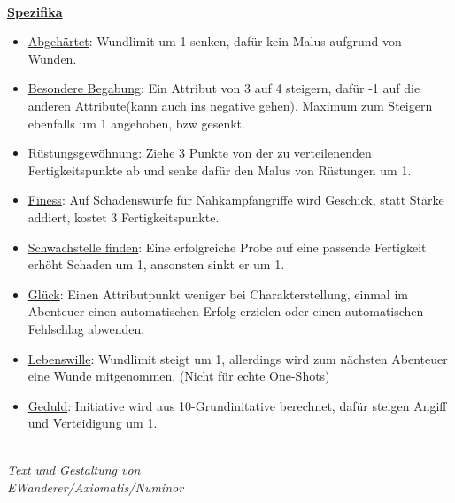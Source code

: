 \documentclass[twoside,a4paper]{minimal}
\begin{document}
\begin{multicols*}{3}
\textbf{\uline{\\Spezifika}}
\begin{itemize}
\item \uline{Abgehärtet}: Wundlimit um 1 senken, dafür kein Malus aufgrund von Wunden.
\item \uline{Besondere Begabung}: Ein Attribut von 3 auf 4 steigern, dafür -1 auf die anderen Attribute(kann auch ins negative gehen). Maximum zum Steigern ebenfalls um 1 angehoben, bzw gesenkt.
\item \uline{Rüstungsgewöhnung}: Ziehe 3 Punkte von der zu verteilenenden Fertigkeitspunkte ab und senke dafür den Malus von Rüstungen um 1.
\item \uline{Finess}: Auf Schadenswürfe für Nahkampfangriffe wird Geschick, statt Stärke addiert, kostet 3 Fertigkeitspunkte.
\item \uline{Schwachstelle finden}: Eine erfolgreiche Probe auf eine passende Fertigkeit erhöht Schaden um 1, ansonsten sinkt er um 1.
\item \uline{Glück}: Einen Attributpunkt weniger bei Charakterstellung, einmal im Abenteuer einen automatischen Erfolg erzielen oder einen automatischen Fehlschlag abwenden.
\item \uline{Lebenswille}: Wundlimit steigt um 1, allerdings wird zum nächsten Abenteuer eine Wunde mitgenommen. (Nicht für echte One-Shots)
\item \uline{Geduld}: Initiative wird aus 10-Grundinitative berechnet, dafür steigen Angiff und Verteidigung um 1. 
\end{itemize}
\textit{\\Text und Gestaltung von\\EWanderer/Axiomatis/Numinor}
\end{multicols*}
\end{document}
